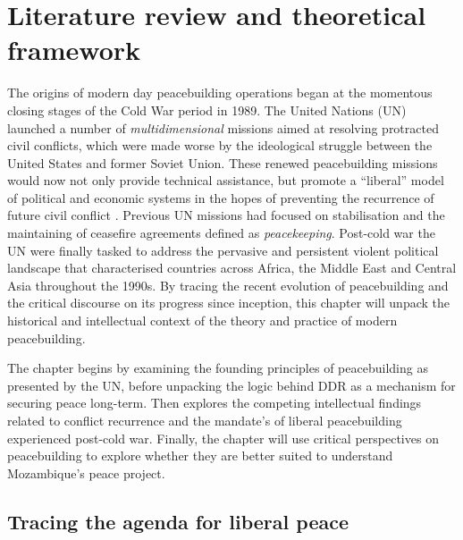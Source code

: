\chapter{Literature review and theoretical framework}
\label{chp:Lit}

The origins of modern day peacebuilding operations began at the momentous closing stages of the Cold War period in 1989. The United Nations (UN) launched a number of \emph{multidimensional} missions aimed at resolving protracted civil conflicts, which were made worse by the ideological struggle between the United States and former Soviet Union. These renewed peacebuilding missions would now not only provide technical assistance, but promote a ``liberal'' model of political and economic systems in the hopes of preventing the recurrence of future civil conflict \citep[chap.~2]{paris2004war}. Previous UN missions had focused on stabilisation and the maintaining of ceasefire agreements defined as \emph{peacekeeping}. Post-cold war the UN were finally tasked to address the pervasive and persistent violent political landscape that characterised countries across Africa, the Middle East and Central Asia throughout the 1990s. By tracing the recent evolution of peacebuilding and the critical discourse on its progress since inception, this chapter will unpack the historical and intellectual context of the theory and practice of modern peacebuilding. 

The chapter begins by examining the founding principles of peacebuilding as presented by the UN, before unpacking the logic behind DDR as a mechanism for securing peace long-term. Then explores the competing intellectual findings related to conflict recurrence and the mandate's of liberal peacebuilding experienced post-cold war. Finally, the chapter will use critical perspectives on peacebuilding to explore whether they are better suited to understand Mozambique's peace project.  

\section{Tracing the agenda for liberal peace}

